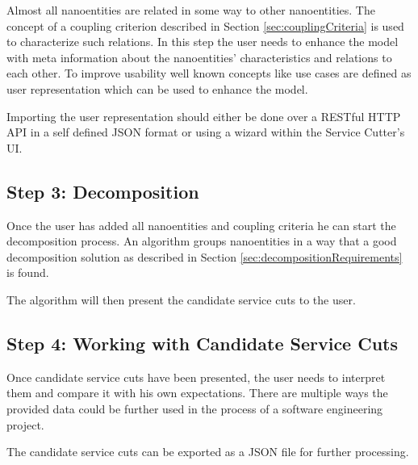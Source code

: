 
Almost all nanoentities are related in some way to other nanoentities. The concept of a coupling criterion described in Section \ref{sec:couplingCriteria} is used to characterize such relations. In this step the user needs to enhance the model with meta information about the nanoentities' characteristics and relations to each other. To improve usability well known concepts like use cases are defined as user representation which can be used to enhance the model. 

Importing the user representation should either be done over a RESTful HTTP API in a self defined JSON format or using a wizard within the Service Cutter's \gls{UI}.

\subsection{Step 3: Decomposition}

Once the user has added all nanoentities and coupling criteria he can start the decomposition process. An algorithm groups nanoentities in a way that a good decomposition solution as described in Section \ref{sec:decompositionRequirements} is found. 

The algorithm will then present the candidate service cuts to the user.

\subsection{Step 4: Working with Candidate Service Cuts}

Once candidate service cuts have been presented, the user needs to interpret them and compare it with his own expectations. There are multiple ways the provided data could be further used in the process of a software engineering project.

The candidate service cuts can be exported as a \gls{JSON} file for further processing.




